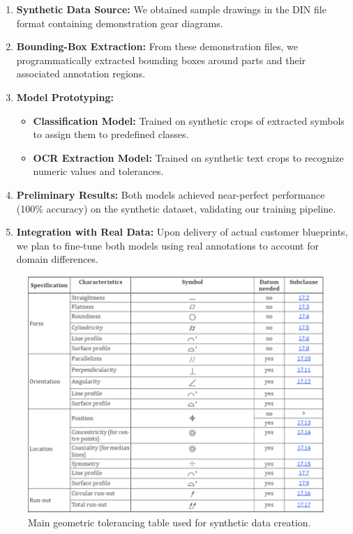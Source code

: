 \documentclass[11pt,a4paper]{article}
\begin{document}
\begin{enumerate}
  \item \textbf{Synthetic Data Source:} We obtained sample drawings in the DIN file format containing demonstration gear diagrams.
  \item \textbf{Bounding-Box Extraction:} From these demonstration files, we programmatically extracted bounding boxes around parts and their associated annotation regions.
  \item \textbf{Model Prototyping:}
    \begin{itemize}
      \item \textbf{Classification Model:} Trained on synthetic crops of extracted symbols to assign them to predefined classes.
      \item \textbf{OCR Extraction Model:} Trained on synthetic text crops to recognize numeric values and tolerances.
    \end{itemize}
  \item \textbf{Preliminary Results:} Both models achieved near-perfect performance (100\% accuracy) on the synthetic dataset, validating our training pipeline.
  \item \textbf{Integration with Real Data:} Upon delivery of actual customer blueprints, we plan to fine-tune both models using real annotations to account for domain differences.
\end{enumerate}

\begin{figure}[h!]
  \centering
    \includegraphics[width=\textwidth]{alternative_approach.png}%
  \caption{Main geometric tolerancing table used for synthetic data creation.}
  \label{fig:geom_tol}
\end{figure}
\end{document}
